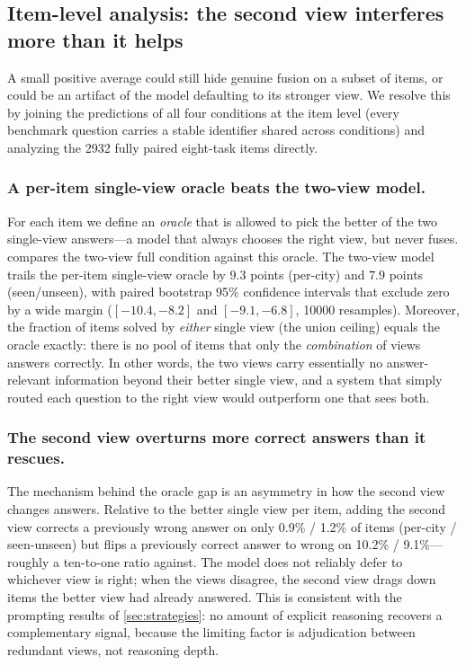 \documentclass[runningheads]{llncs}
\begin{document}
\subsection{Item-level analysis: the second view interferes more than it helps}
\label{sec:itemlevel}

A small positive average could still hide genuine fusion on a subset of items, or
could be an artifact of the model defaulting to its stronger view. We resolve this
by joining the predictions of all four conditions at the item level (every
benchmark question carries a stable identifier shared across conditions) and
analyzing the \num{2932} fully paired eight-task items directly.

\subsubsection{A per-item single-view oracle beats the two-view model.}
For each item we define an \emph{oracle} that is allowed to pick the better of the
two single-view answers---a model that always chooses the right view, but never
fuses.  compares the two-view \textsf{full} condition against
this oracle. The two-view model trails the per-item single-view oracle by
$\num{9.3}$ points (per-city) and $\num{7.9}$ points (seen/unseen), with paired
bootstrap \num{95}\% confidence intervals that exclude zero by a wide margin
($[\num{-10.4},\num{-8.2}]$ and $[\num{-9.1},\num{-6.8}]$, \num{10000} resamples).
Moreover, the fraction of items solved by \emph{either} single view (the union
ceiling) equals the oracle exactly: there is no pool of items that only the
\emph{combination} of views answers correctly. In other words, the two views
carry essentially no answer-relevant information beyond their better single view,
and a system that simply routed each question to the right view would outperform
one that sees both.

\subsubsection{The second view overturns more correct answers than it rescues.}
The mechanism behind the oracle gap is an asymmetry in how the second view changes
answers. Relative to the better single view per item, adding the second view
corrects a previously wrong answer on only \num{0.9}\% / \num{1.2}\% of items
(per-city / seen-unseen) but flips a previously correct answer to wrong on
\num{10.2}\% / \num{9.1}\%---roughly a ten-to-one ratio against. The model does
not reliably defer to whichever view is right; when the views disagree, the second
view drags down items the better view had already answered. This is consistent
with the prompting results of \cref{sec:strategies}: no amount of explicit
reasoning recovers a complementary signal, because the limiting factor is
adjudication between redundant views, not reasoning depth.
\end{document}

